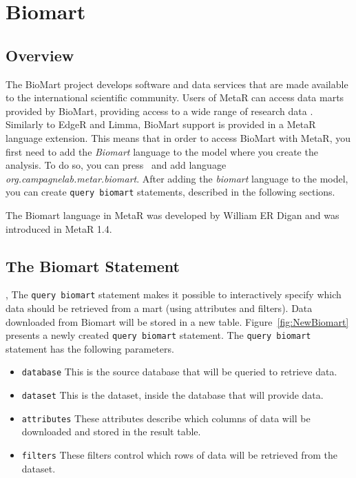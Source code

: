 

\chapter{Biomart}\label{chap:Biomart}

\section{Overview}
The BioMart project develops software and data services that are made available to the international scientific community. Users of MetaR can access data marts provided by BioMart, providing access to a wide range of research data . Similarly to EdgeR and Limma, BioMart support is provided in a MetaR language extension. This means that in order to access BioMart with MetaR, you first need to add the \textit{Biomart} language to the model where you create the analysis. To do so, you can press~ and add language \textit{org\allowbreak.campagnelab\allowbreak.metar\allowbreak.biomart}. After adding the \textit{biomart} language to the model, you can create \texttt{query biomart} statements, described in the following sections. 
\begin{remark}
The Biomart language in MetaR was developed by William ER Digan and was introduced in MetaR 1.4.
\end{remark}

\section{The Biomart Statement},
The \texttt{query biomart} statement makes it possible to interactively specify which data should be retrieved from a mart (using attributes and filters). Data downloaded from Biomart will be stored in a new table. Figure~\ref{fig:NewBiomart} presents a newly created \texttt{query biomart} statement.
The \texttt{query biomart} statement has the following parameters.
\begin{itemize}
\item \texttt{database} This is the source database that will be queried to retrieve data.
\item \texttt{dataset} This is the dataset, inside the database that will provide data.
\item \texttt{attributes} These attributes describe which columns of data will be downloaded and stored in the result table.
\item \texttt{filters} These filters control which rows of data will be retrieved from the dataset.
\end{itemize} 

